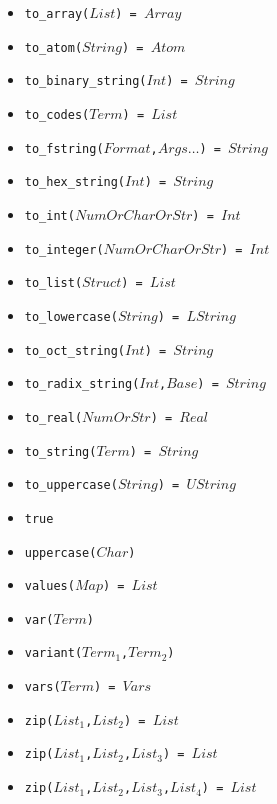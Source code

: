 \documentclass[10pt]{article}
\begin{document}
\begin{multicols}{2}
\begin{scriptsize}
\begin{itemize}
    \item \texttt{to\_array($List$) = $Array$} 
    \item \texttt{to\_atom($String$) = $Atom$} 
    \item \texttt{to\_binary\_string($Int$) = $String$}
    \item \texttt{to\_codes($Term$) = $List$}        
    \item \texttt{to\_fstring($Format$,$Args\ldots$) = $String$}
    \item \texttt{to\_hex\_string($Int$) = $String$}    
    \item \texttt{to\_int($NumOrCharOrStr$) = $Int$} 
    \item \texttt{to\_integer($NumOrCharOrStr$) = $Int$} 
    \item \texttt{to\_list($Struct$) = $List$} 
    \item \texttt{to\_lowercase($String$) = $LString$}
    \item \texttt{to\_oct\_string($Int$) = $String$}    
    \item \texttt{to\_radix\_string($Int$,$Base$) = $String$}
    \item \texttt{to\_real($NumOrStr$) = $Real$} 
    \item \texttt{to\_string($Term$) = $String$}        
    \item \texttt{to\_uppercase($String$) = $UString$}
    \item \texttt{true}
    \item \texttt{uppercase($Char$)} 
    \item \texttt{values($Map$) = $List$} 
    \item \texttt{var($Term$)} 
    \item \texttt{variant($Term_1$,$Term_2$)}
    \item \texttt{vars($Term$) = $Vars$}
    \item \texttt{zip($List_1$,$List_2$) = $List$} 
    \item \texttt{zip($List_1$,$List_2$,$List_3$) = $List$} 
    \item \texttt{zip($List_1$,$List_2$,$List_3$,$List_4$) = $List$} 
\end{itemize}
\end{scriptsize}


\end{multicols}
\end{document}
